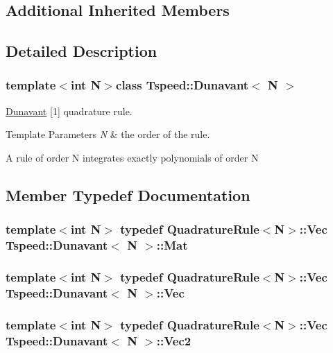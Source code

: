\subsection*{Additional Inherited Members}


\subsection{Detailed Description}
\subsubsection*{template$<$int N$>$class Tspeed\-::\-Dunavant$<$ N $>$}

\hyperlink{classTspeed_1_1Dunavant}{Dunavant} \mbox{[}1\mbox{]} quadrature rule. 


\begin{DoxyTemplParams}{Template Parameters}
{\em N} & the order of the rule.\\
\hline
\end{DoxyTemplParams}
A rule of order N integrates exactly polynomials of order N 

\subsection{Member Typedef Documentation}
\hypertarget{classTspeed_1_1Dunavant_a87e65aed6cfa6ace8ea6374f3b005d78}{
\subsubsection[{Mat}]{\setlength{\rightskip}{0pt plus 5cm}template$<$int N$>$ typedef {\bf Quadrature\-Rule}$<$N$>$\-::{\bf Vec} {\bf Tspeed\-::\-Dunavant}$<$ N $>$\-::{\bf Mat}}}\label{classTspeed_1_1Dunavant_a87e65aed6cfa6ace8ea6374f3b005d78}
\hypertarget{classTspeed_1_1Dunavant_a8562daa3d038126144415fa4ba851e81}{
\subsubsection[{Vec}]{\setlength{\rightskip}{0pt plus 5cm}template$<$int N$>$ typedef {\bf Quadrature\-Rule}$<$N$>$\-::{\bf Vec} {\bf Tspeed\-::\-Dunavant}$<$ N $>$\-::{\bf Vec}}}\label{classTspeed_1_1Dunavant_a8562daa3d038126144415fa4ba851e81}
\hypertarget{classTspeed_1_1Dunavant_acc838f609850fd31cbbeb87578b1a8c5}{
\subsubsection[{Vec2}]{\setlength{\rightskip}{0pt plus 5cm}template$<$int N$>$ typedef {\bf Quadrature\-Rule}$<$N$>$\-::{\bf Vec} {\bf Tspeed\-::\-Dunavant}$<$ N $>$\-::{\bf Vec2}}}\label{classTspeed_1_1Dunavant_acc838f609850fd31cbbeb87578b1a8c5}


